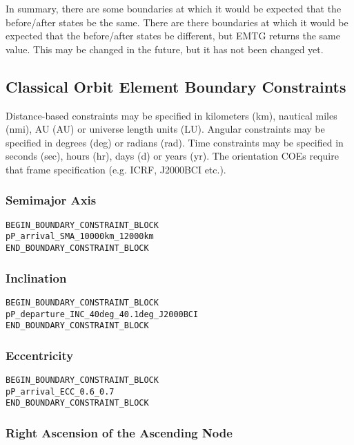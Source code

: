 \documentclass[11pt]{article}
\begin{document}
In summary, there are some boundaries at which it would be expected that the before/after states be the same. There are there boundaries at which it would be expected that the before/after states be different, but EMTG returns the same value. This may be changed in the future, but it has not been changed yet.

\subsection{Classical Orbit Element Boundary Constraints}
\label{sec:boundaryCOEconstraints}

Distance-based constraints may be specified in kilometers (km), nautical miles (nmi), \ac{AU} (AU) or universe length units (LU). Angular constraints may be specified in degrees (deg) or radians (rad). Time constraints may be specified in seconds (sec), hours (hr), days (d) or years (yr). The orientation COEs require that frame specification (e.g. ICRF, J2000BCI etc.).

\subsubsection{Semimajor Axis}
\label{sec:boundarySMAconstraint}

\begin{verbatim}
BEGIN_BOUNDARY_CONSTRAINT_BLOCK
pP_arrival_SMA_10000km_12000km
END_BOUNDARY_CONSTRAINT_BLOCK
\end{verbatim}

\subsubsection{Inclination}
\label{sec:boundaryINCconstraint}
\begin{verbatim}
BEGIN_BOUNDARY_CONSTRAINT_BLOCK
pP_departure_INC_40deg_40.1deg_J2000BCI
END_BOUNDARY_CONSTRAINT_BLOCK
\end{verbatim}

\subsubsection{Eccentricity}
\label{sec:boundaryECCconstraint}

\begin{verbatim}
BEGIN_BOUNDARY_CONSTRAINT_BLOCK
pP_arrival_ECC_0.6_0.7
END_BOUNDARY_CONSTRAINT_BLOCK
\end{verbatim}

\subsubsection{Right Ascension of the Ascending Node}
\label{sec:boundaryRAANconstraint}
\end{document}
